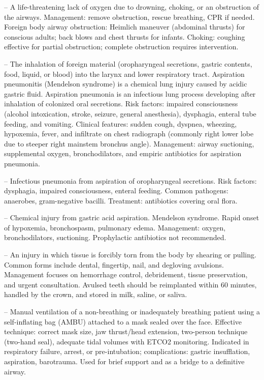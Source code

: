 -- A life-threatening lack of oxygen due to drowning, choking, or an obstruction of the airways. Management: remove obstruction, rescue breathing, CPR if needed. Foreign body airway obstruction: Heimlich maneuver (abdominal thrusts) for conscious adults; back blows and chest thrusts for infants. Choking: coughing effective for partial obstruction; complete obstruction requires intervention.

-- The inhalation of foreign material (oropharyngeal secretions, gastric contents, food, liquid, or blood) into the larynx and lower respiratory tract. Aspiration pneumonitis (Mendelson syndrome) is a chemical lung injury caused by acidic gastric fluid. Aspiration pneumonia is an infectious lung process developing after inhalation of colonized oral secretions. Risk factors: impaired consciousness (alcohol intoxication, stroke, seizure, general anesthesia), dysphagia, enteral tube feeding, and vomiting. Clinical features: sudden cough, dyspnea, wheezing, hypoxemia, fever, and infiltrate on chest radiograph (commonly right lower lobe due to steeper right mainstem bronchus angle). Management: airway suctioning, supplemental oxygen, bronchodilators, and empiric antibiotics for aspiration pneumonia.

-- Infectious pneumonia from aspiration of oropharyngeal secretions. Risk factors: dysphagia, impaired consciousness, enteral feeding. Common pathogens: anaerobes, gram-negative bacilli. Treatment: antibiotics covering oral flora.

-- Chemical injury from gastric acid aspiration. Mendelson syndrome. Rapid onset of hypoxemia, bronchospasm, pulmonary edema. Management: oxygen, bronchodilators, suctioning. Prophylactic antibiotics not recommended.

-- An injury in which tissue is forcibly torn from the body by shearing or pulling. Common forms include dental, fingertip, nail, and degloving avulsions. Management focuses on hemorrhage control, debridement, tissue preservation, and urgent consultation. Avulsed teeth should be reimplanted within 60 minutes, handled by the crown, and stored in milk, saline, or saliva.

-- Manual ventilation of a non-breathing or inadequately breathing patient using a self-inflating bag (AMBU) attached to a mask sealed over the face. Effective technique: correct mask size, jaw thrust/head extension, two-person technique (two-hand seal), adequate tidal volumes with ETCO2 monitoring. Indicated in respiratory failure, arrest, or pre-intubation; complications: gastric insufflation, aspiration, barotrauma. Used for brief support and as a bridge to a definitive airway.

